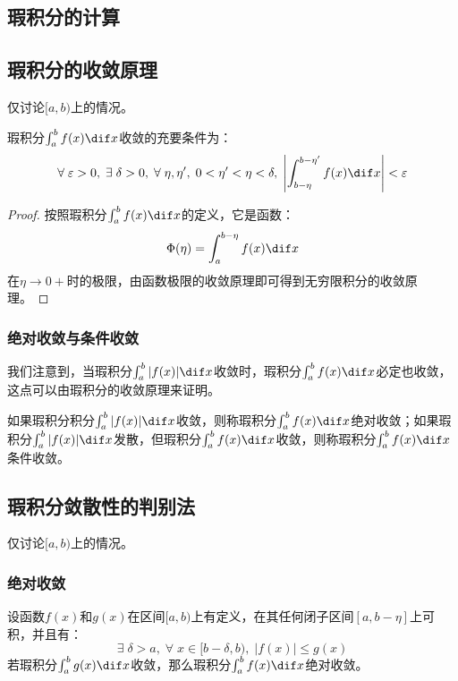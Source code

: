 \subsection{瑕积分的计算}

\subsection{瑕积分的收敛原理}
仅讨论$[a,b)$上的情况。\par
\begin{theorem}
	瑕积分$\int_{a}^{b}f(x)\dif x$收敛的充要条件为：
	\begin{equation*}
		\forall\;\varepsilon>0,\;\exists\;\delta>0,\;\forall\;\eta,\eta',\;0<\eta'<\eta<\delta,\;\left|\int_{b-\eta}^{b-\eta'}f(x)\dif x\right|<\varepsilon
	\end{equation*}
\end{theorem}
\begin{proof}
	按照瑕积分$\int_{a}^{b}f(x)\dif x$的定义，它是函数：
	\begin{equation*}
		\Phi(\eta)=\int_{a}^{b-\eta}f(x)\dif x
	\end{equation*}
	在$\eta\to0+$时的极限，由函数极限的收敛原理即可得到无穷限积分的收敛原理。
\end{proof}
\subsubsection{绝对收敛与条件收敛}
我们注意到，当瑕积分$\int_{a}^{b}|f(x)|\dif x$收敛时，瑕积分$\int_{a}^{b}f(x)\dif x$必定也收敛，这点可以由瑕积分的收敛原理来证明。
\begin{definition}
	如果瑕积分积分$\int_{a}^{b}|f(x)|\dif x$收敛，则称瑕积分$\int_{a}^{b}f(x)\dif x$绝对收敛；如果瑕积分$\int_{a}^{b}|f(x)|\dif x$发散，但瑕积分$\int_{a}^{b}f(x)\dif x$收敛，则称瑕积分$\int_{a}^{b}f(x)\dif x$条件收敛。
\end{definition}

\subsection{瑕积分敛散性的判别法}
仅讨论$[a,b)$上的情况。
\subsubsection{绝对收敛}
\begin{theorem}
	设函数$f(x)$和$g(x)$在区间$[a,b)$上有定义，在其任何闭子区间$[a,b-\eta]$上可积，并且有：
	\begin{equation*}
		\exists\;\delta>a,\;\forall\;x\in[b-\delta,b),\;|f(x)|\leqslant g(x)
	\end{equation*}
	若瑕积分$\int_{a}^{b}g(x)\dif x$收敛，那么瑕积分$\int_{a}^{b}f(x)\dif x$绝对收敛。
\end{theorem}